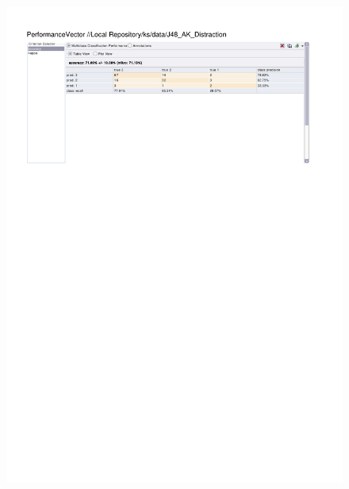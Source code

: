 \begin{figure}[htp]
  \centerline{\includegraphics[trim=0 682 0 60,clip,width=16.09cm]{results/J48_A_Distraction.pdf}} \caption{
} \label{J48_A_Distraction}
\end{figure}

